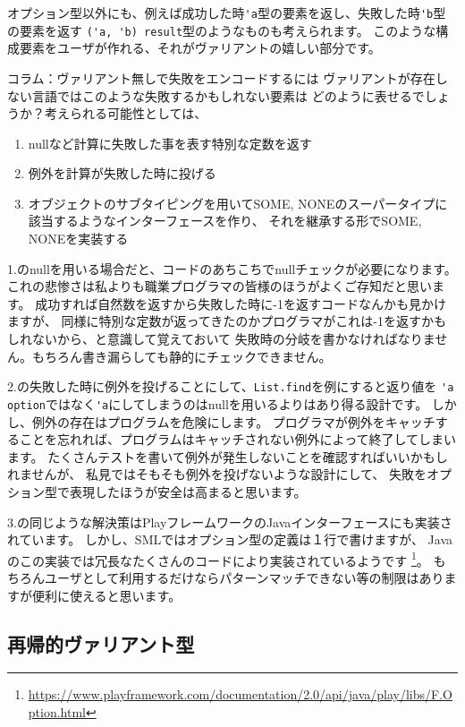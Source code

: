 \documentclass[11pt,a4paper]{article}
\begin{document}
オプション型以外にも、例えば成功した時\lstinline{'a}型の要素を返し、失敗した時\lstinline{'b}型の要素を返す
\lstinline{('a, 'b) result}型のようなものも考えられます。
このような構成要素をユーザが作れる、それがヴァリアントの嬉しい部分です。

\begin{itembox}[l]{コラム：ヴァリアント無しで失敗をエンコードするには}
ヴァリアントが存在しない言語ではこのような失敗するかもしれない要素は
どのように表せるでしょうか？考えられる可能性としては、
\begin{enumerate}
\item nullなど計算に失敗した事を表す特別な定数を返す
\item 例外を計算が失敗した時に投げる
\item オブジェクトのサブタイピングを用いてSOME, NONEのスーパータイプに該当するようなインターフェースを作り、
  それを継承する形でSOME, NONEを実装する
\end{enumerate}

1.のnullを用いる場合だと、コードのあちこちでnullチェックが必要になります。
これの悲惨さは私よりも職業プログラマの皆様のほうがよくご存知だと思います。
成功すれば自然数を返すから失敗した時に-1を返すコードなんかも見かけますが、
同様に特別な定数が返ってきたのかプログラマがこれは-1を返すかもしれないから、と意識して覚えておいて
失敗時の分岐を書かなければなりません。もちろん書き漏らしても静的にチェックできません。

2.の失敗した時に例外を投げることにして、\lstinline{List.find}を例にすると返り値を
\lstinline{'a option}ではなく\lstinline{'a}にしてしまうのはnullを用いるよりはあり得る設計です。
しかし、例外の存在はプログラムを危険にします。
プログラマが例外をキャッチすることを忘れれば、プログラムはキャッチされない例外によって終了してしまいます。
たくさんテストを書いて例外が発生しないことを確認すればいいかもしれませんが、
私見ではそもそも例外を投げないような設計にして、
失敗をオプション型で表現したほうが安全は高まると思います。

3.の同じような解決策はPlayフレームワークのJavaインターフェースにも実装されています。
しかし、SMLではオプション型の定義は１行で書けますが、
Javaのこの実装では冗長なたくさんのコードにより実装されているようです
\footnote{\url{https://www.playframework.com/documentation/2.0/api/java/play/libs/F.Option.html}}。
もちろんユーザとして利用するだけならパターンマッチできない等の制限はありますが便利に使えると思います。
\end{itembox}

\subsection{再帰的ヴァリアント型}
\end{document}
